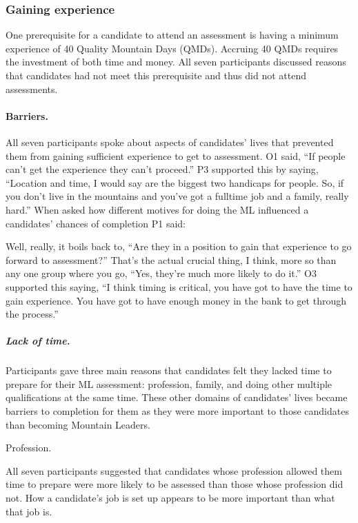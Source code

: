 \documentclass[a4paper,]{book}
\let\oldparagraph\paragraph
\renewcommand{\paragraph}[1]{\oldparagraph{#1}\mbox{}}
\let\oldsubparagraph\subparagraph
\renewcommand{\subparagraph}[1]{\oldsubparagraph{#1}\mbox{}}
\begin{document}
\hypertarget{gaining-experience}{%
\subsubsection{Gaining experience}\label{gaining-experience}}

One prerequisite for a candidate to attend an assessment is having a minimum experience of 40 Quality Mountain Days (QMDs). Accruing 40 QMDs requires the investment of both time and money. All seven participants discussed reasons that candidates had not meet this prerequisite and thus did not attend assessments.

\hypertarget{barriers.}{%
\paragraph{Barriers.}\label{barriers.}}

All seven participants spoke about aspects of candidates' lives that prevented them from gaining sufficient experience to get to assessment. O1 said, ``If people can't get the experience they can't proceed.'' P3 supported this by saying, ``Location and time, I would say are the biggest two handicaps for people. So, if you don't live in the mountains and you've got a fulltime job and a family, really hard.'' When asked how different motives for doing the ML influenced a candidates' chances of completion P1 said:

Well, really, it boils back to, ``Are they in a position to gain that experience to go forward to assessment?'' That's the actual crucial thing, I think, more so than any one group where you go, ``Yes, they're much more likely to do it.''
O3 supported this saying, ``I think timing is critical, you have got to have the time to gain experience. You have got to have enough money in the bank to get through the process.''

\hypertarget{lack-of-time.}{%
\subparagraph{Lack of time.}\label{lack-of-time.}}

Participants gave three main reasons that candidates felt they lacked time to prepare for their ML assessment: profession, family, and doing other multiple qualifications at the same time. These other domains of candidates' lives became barriers to completion for them as they were more important to those candidates than becoming Mountain Leaders.

Profession.

All seven participants suggested that candidates whose profession allowed them time to prepare were more likely to be assessed than those whose profession did not. How a candidate's job is set up appears to be more important than what that job is.
\end{document}
